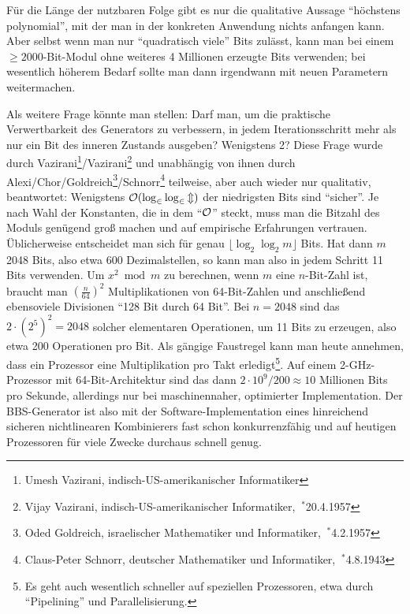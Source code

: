 \begin{refsegment}
Für die Länge der nutzbaren Folge gibt es nur die qualitative Aussage
"`höchstens polynomial"', mit der man in der konkreten Anwendung nichts
anfangen kann. Aber selbst wenn man nur "`quadratisch viele"' Bits zulässt,
kann man bei einem $\geq 2000$-Bit-Modul ohne weiteres 4 Millionen
erzeugte Bits verwenden; bei wesentlich höherem Bedarf sollte man dann
irgendwann mit neuen Parametern weitermachen.

Als weitere Frage könnte man stellen: Darf man, um die praktische Verwertbarkeit
des Generators zu verbessern, in jedem Iterationsschritt mehr als nur ein Bit
des inneren Zustands ausgeben? Wenigstens 2? Diese Frage wurde durch
Vazirani\footnote{%
  Umesh Vazirani, indisch-US-amerikanischer Informatiker
}/Vazirani\footnote{%
  Vijay Vazirani, indisch-US-amerikanischer Informatiker, $~^{\ast}$20.4.1957
} und
unabhängig von ihnen durch Alexi/Chor/Gold\-reich\footnote{%
  Oded Goldreich, israelischer Mathematiker und Informatiker, $~^{\ast}$4.2.1957
}/Schnorr\footnote{%
  Claus-Peter Schnorr, deutscher Mathematiker und Informatiker, $~^{\ast}$4.8.1943
} teilweise, aber auch wieder
nur qualitativ, beantwortet: Wenigstens $\cal{O}(\log_2 \log_2 m)$ der niedrigsten
Bits sind "`sicher"'. Je nach Wahl der Konstanten, die in dem "`$\cal{O}$"' steckt,
muss man die Bitzahl des Moduls genügend groß machen und auf empirische
Erfahrungen vertrauen. Üblicherweise entscheidet man sich für genau
$\lfloor \log_2 \log_2 m \rfloor$ Bits.
Hat dann $m$ 2048 Bits, also etwa 600 Dezimalstellen, so kann man also in
jedem Schritt 11 Bits verwenden. Um $x^2 \bmod m$ zu berechnen, wenn $m$
eine $n$-Bit-Zahl ist, braucht man $(\frac{n}{64})^2$ Multiplikationen von
64-Bit-Zahlen und anschließend ebensoviele Divisionen "`128 Bit durch 64 Bit"'.
Bei $n = 2048$ sind das $2 \cdot (2^5)^2 = 2048$ solcher elementaren Operationen,
um 11 Bits zu erzeugen, also etwa 200 Operationen pro Bit.
Als gängige Faustregel kann man heute annehmen, dass ein Prozessor
eine Multiplikation pro Takt erledigt\footnote{%
  Es geht auch wesentlich schneller auf speziellen Prozessoren, etwa durch
  "`Pipelining"' und Parallelisierung.
}.
Auf einem 2-GHz-Prozessor mit 64-Bit-Architektur sind das dann
$2\cdot 10^9 / 200 \approx 10$ Millionen Bits pro Sekunde, allerdings nur
bei maschinennaher, optimierter Implementation. Der BBS-Generator ist
also mit der Software-Implementation eines hinreichend sicheren nichtlinearen
Kombinierers fast schon konkurrenzfähig und auf heutigen Prozessoren für
viele Zwecke durchaus schnell genug.


\end{refsegment}
